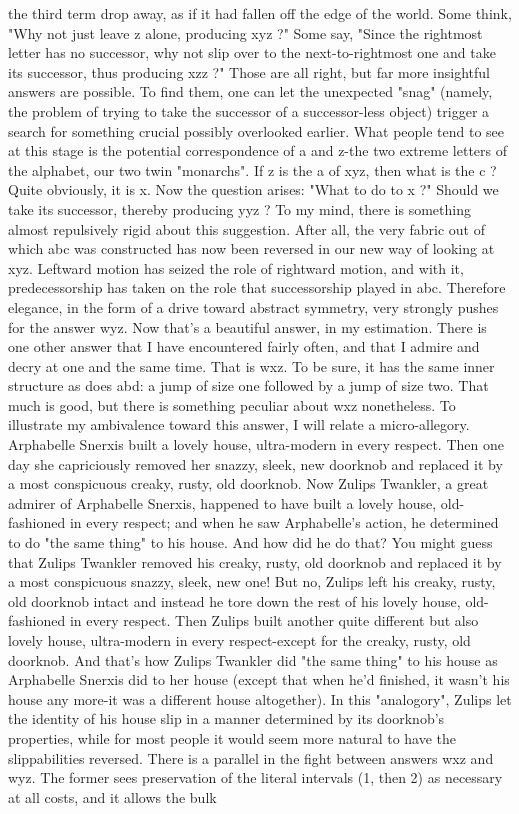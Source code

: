 the third term drop away, as if it had fallen off the edge of the world. Some think,
"Why not just leave z alone, producing xyz ?" Some say, "Since the rightmost letter
has no successor, why not slip over to the next-to-rightmost one and take its
successor, thus producing xzz ?"
         Those are all right, but far more insightful answers are possible. To find them,
one can let the unexpected "snag" (namely, the problem of trying to take the successor
of a successor-less object) trigger a search for something crucial possibly overlooked
earlier. What people tend to see at this stage is the potential correspondence of a and
z-the two extreme letters of the alphabet, our two twin "monarchs". If z is the a of
xyz, then what is the c ? Quite obviously, it is x. Now the question arises: "What to do
to x ?" Should we take its successor, thereby producing yyz ? To my mind, there is
something almost repulsively rigid about this suggestion. After all, the very fabric out
of which abc was constructed has now been reversed in our new way of looking at
xyz. Leftward motion has seized the role of rightward motion, and with it,
predecessorship has taken on the role that successorship played in abc. Therefore
elegance, in the form of a drive toward abstract symmetry, very strongly pushes for
the answer wyz. Now that's a beautiful answer, in my estimation.
         There is one other answer that I have encountered fairly often, and that I
admire and decry at one and the same time. That is wxz. To be sure, it has the same
inner structure as does abd: a jump of size one followed by a jump of size two. That
much is good, but there is something peculiar about wxz nonetheless. To illustrate my
ambivalence toward this answer, I will relate a micro-allegory.
         Arphabelle Snerxis built a lovely house, ultra-modern in every respect. Then
one day she capriciously removed her snazzy, sleek, new doorknob and replaced it by
a most conspicuous creaky, rusty, old doorknob. Now Zulips Twankler, a great
admirer of Arphabelle Snerxis, happened to have built a lovely house, old-fashioned
in every respect; and when he saw Arphabelle's action, he determined to do "the same
thing" to his house. And how did he do that? You might guess that Zulips Twankler
removed his creaky, rusty, old doorknob and replaced it by a most conspicuous
snazzy, sleek, new one! But no, Zulips left his creaky, rusty, old doorknob intact and
instead he tore down the rest of his lovely house, old-fashioned in every respect. Then
Zulips built another quite different but also lovely house, ultra-modern in every
respect-except for the creaky, rusty, old doorknob. And that's how Zulips Twankler
did "the same thing" to his house as Arphabelle Snerxis did to her house (except that
when he'd finished, it wasn't his house any more-it was a different house altogether).
         In this "analogory", Zulips let the identity of his house slip in a manner
determined by its doorknob's properties, while for most people it would seem more
natural to have the slippabilities reversed. There is a parallel in the fight between
answers wxz and wyz. The former sees preservation of the literal intervals (1, then 2)
as necessary at all costs, and it allows the bulk




